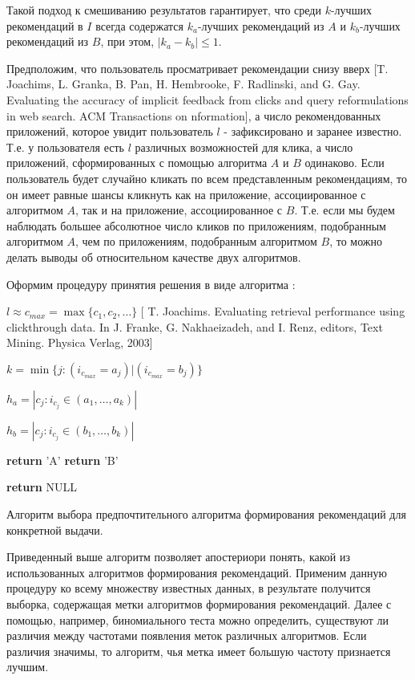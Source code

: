 \documentclass[12pt,a4paper]{report}
\begin{document}
Такой подход к смешиванию результатов гарантирует, что среди $k$-лучших рекомендаций в $I$ всегда содержатся $k_a$-лучших рекомендаций из $A$ и $k_b$-лучших рекомендаций из $B$, при этом, $|k_a-k_b| \le 1$.

Предположим, что пользователь просматривает рекомендации снизу вверх [T. Joachims, L. Granka, B. Pan, H. Hembrooke, F. Radlinski, and G. Gay. Evaluating the accuracy of implicit feedback from clicks and query reformulations in web search. ACM Transactions on nformation], а число рекомендованных приложений, которое увидит пользователь $l$ - зафиксировано и заранее известно. Т.е. у пользователя есть $l$ различных возможностей для клика, а число приложений, сформированных с помощью алгоритма $A$ и $B$ одинаково. Если пользователь будет случайно кликать по всем представленным рекомендациям, то он имеет равные шансы кликнуть как на приложение, ассоциированное с алгоритмом $A$, так и на приложение, ассоциированное с $B$. Т.е. если мы будем наблюдать большее абсолютное число кликов по приложениям, подобранным алгоритмом $A$, чем по приложениям, подобранным алгоритмом $B$, то можно делать выводы об относительном качестве двух алгоритмов.

Оформим процедуру принятия решения в виде алгоритма \cite{Td}:


\begin{algorithm}[H]
\SetAlgoLined
{}
$l \approx c_{max} = \max\{c_1,c_2,\dots\}$ [ T. Joachims. Evaluating retrieval performance using clickthrough data. In J. Franke, G. Nakhaeizadeh, and I. Renz, editors, Text Mining. Physica Verlag, 2003]

$k = \min\{j: (i_{c_{max}} = a_j) | (i_{c_{max}} = b_j)\}$

$h_a = |{c_j: i_{c_j} \in (a_1, \dots, a_k)}|$

$h_b = |{c_j: i_{c_j} \in (b_1, \dots, b_k)}|$

 {
\textbf{return} 'A'
}
 {
\textbf{return} 'B'
}

\textbf{return} NULL

\caption{Алгоритм выбора предпочтительного алгоритма формирования рекомендаций для конкретной выдачи.}
\label{alg:CBI}
\end{algorithm}

Приведенный выше алгоритм позволяет апостериори понять, какой из использованных алгоритмов формирования рекомендаций.
Применим данную процедуру ко всему множеству известных данных, в результате получится выборка, содержащая метки алгоритмов формирования рекомендаций. Далее с помощью, например, биномиального теста можно определить, существуют ли различия между частотами появления меток различных алгоритмов. Если различия значимы, то алгоритм, чья метка имеет большую частоту признается лучшим.
\end{document}

